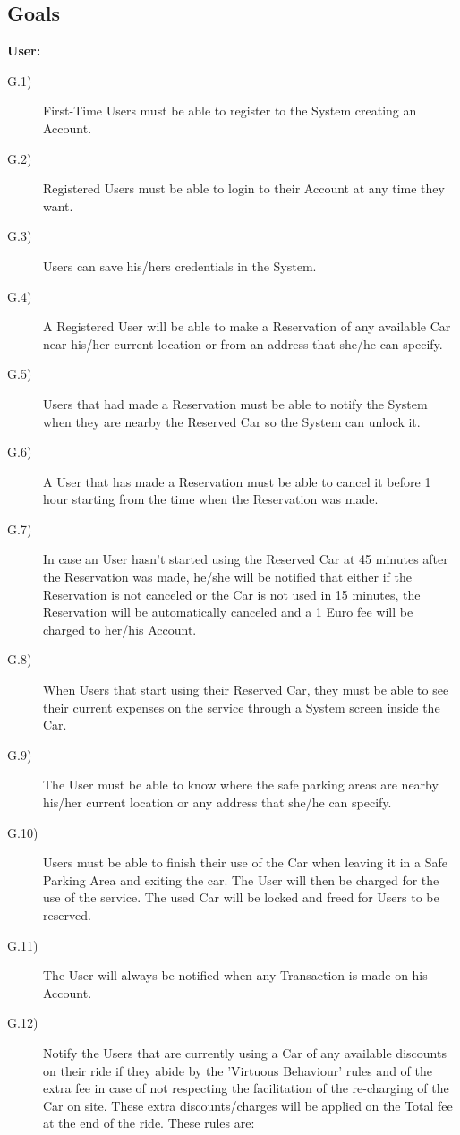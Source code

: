 \documentclass[a4paper]{article}
\begin{document}
\subsection{Goals}
\textbf{User:}
\begin{description}
\item [G.1)]First-Time Users must be able to register to the System creating an Account. 
\item [G.2)]Registered Users must be able to login to their Account at any time they want.
\item [G.3)]Users can save his/hers credentials in the System.
\item [G.4)]A Registered User will be able to make a Reservation of any available Car near his/her current location or from an address that she/he can specify.
\item [G.5)]Users that had made a Reservation must be able to notify the System when they are nearby the Reserved Car so the System can unlock it.
\item [G.6)]A User that has made a Reservation must be able to cancel it before 1 hour starting from the time when the Reservation was made.
\item [G.7)]In case an User hasn't started using the Reserved Car at 45 minutes after the Reservation was made, he/she will be notified that either if the Reservation is not canceled or the Car is not used in 15 minutes, the Reservation will be automatically canceled and a 1 Euro fee will be charged to her/his Account.
\item [G.8)]When Users that start using their Reserved Car, they must be able to see their current expenses on the service through a System screen inside the Car.
\item [G.9)]The User must be able to know where the safe parking areas are nearby his/her current location or any address that she/he can specify.
\item [G.10)]Users must be able to finish their use of the Car when leaving it in a Safe Parking Area and exiting the car. The User will then be charged for the use of the service. The used Car will be locked and freed for Users to be reserved.
\item [G.11)]The User will always be notified when any Transaction is made on his Account.
\item [G.12)]Notify the Users that are currently using a Car of any available discounts on their ride if they abide by the 'Virtuous Behaviour' rules and of the extra fee in case of not respecting the facilitation of the re-charging of the Car on site. These extra discounts/charges will be applied on the Total fee at the end of the ride. These rules are:

\end{description}
\end{document}
